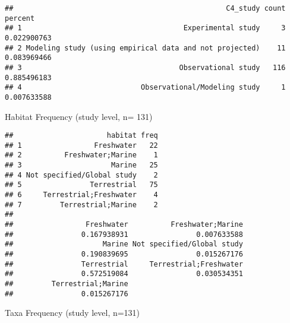 \documentclass[
]{article}
\newenvironment{Shaded}{\begin{snugshade}}{\end{snugshade}}
\newcommand{\KeywordTok}[1]{\textcolor[rgb]{0.13,0.29,0.53}{\textbf{#1}}}
\newcommand{\NormalTok}[1]{#1}
\newcommand{\OperatorTok}[1]{\textcolor[rgb]{0.81,0.36,0.00}{\textbf{#1}}}
\newcommand{\StringTok}[1]{\textcolor[rgb]{0.31,0.60,0.02}{#1}}
\begin{document}
\begin{verbatim}
##                                                  C4_study count     percent
## 1                                      Experimental study     3 0.022900763
## 2 Modeling study (using empirical data and not projected)    11 0.083969466
## 3                                     Observational study   116 0.885496183
## 4                            Observational/Modeling study     1 0.007633588
\end{verbatim}

Habitat Frequency (study level, n= 131)

\begin{Shaded}
\end{Shaded}

\begin{verbatim}
##                      habitat freq
## 1                 Freshwater   22
## 2          Freshwater;Marine    1
## 3                     Marine   25
## 4 Not specified/Global study    2
## 5                Terrestrial   75
## 6     Terrestrial;Freshwater    4
## 7         Terrestrial;Marine    2
## 
##                 Freshwater          Freshwater;Marine 
##                0.167938931                0.007633588 
##                     Marine Not specified/Global study 
##                0.190839695                0.015267176 
##                Terrestrial     Terrestrial;Freshwater 
##                0.572519084                0.030534351 
##         Terrestrial;Marine 
##                0.015267176
\end{verbatim}

Taxa Frequency (study level, n=131)
\end{document}
